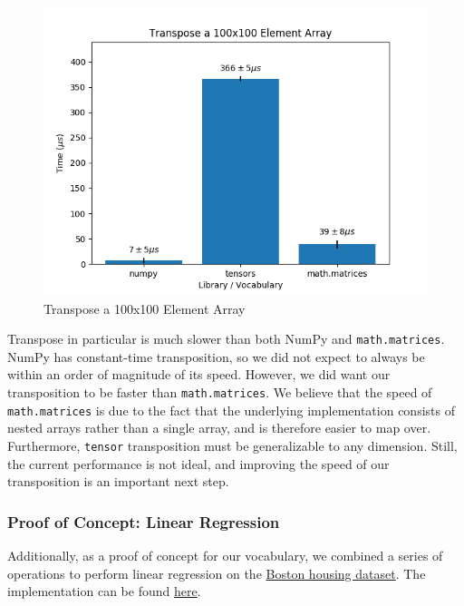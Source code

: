 \documentclass[
]{article}
\begin{document}
\begin{figure}
\centering
\includegraphics{transpose.png}
\caption{Transpose a 100x100 Element Array}
\end{figure}

Transpose in particular is much slower than both NumPy and
\texttt{math.matrices}. NumPy has constant-time transposition, so we did
not expect to always be within an order of magnitude of its speed.
However, we did want our transposition to be faster than
\texttt{math.matrices}. We believe that the speed of
\texttt{math.matrices} is due to the fact that the underlying
implementation consists of nested arrays rather than a single array, and
is therefore easier to map over. Furthermore, \texttt{tensor}
transposition must be generalizable to any dimension. Still, the current
performance is not ideal, and improving the speed of our transposition
is an important next step.

\hypertarget{proof-of-concept-linear-regression}{%
\subsubsection{Proof of Concept: Linear
Regression}\label{proof-of-concept-linear-regression}}

Additionally, as a proof of concept for our vocabulary, we combined a
series of operations to perform linear regression on the
\href{https://www.cs.toronto.edu/~delve/data/boston/bostonDetail.html}{Boston
housing dataset}. The implementation can be found
\href{https://github.com/factor/factor/blob/master/extra/tensors/demos/demos.factor}{here}.
\end{document}
